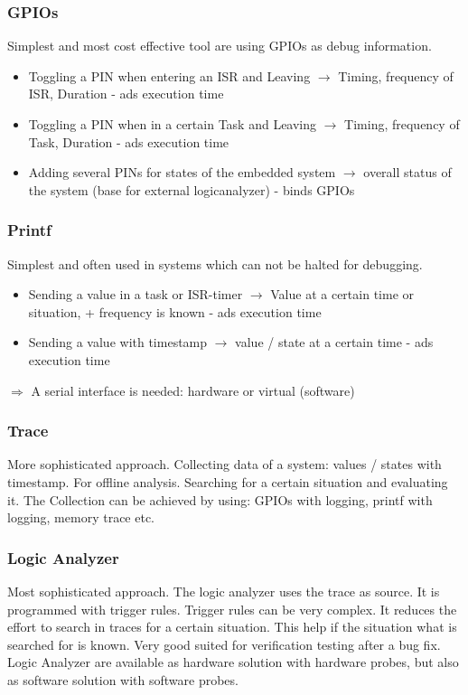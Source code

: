 \subsubsection{GPIOs}
Simplest and most cost effective tool are using GPIOs as debug information.
\begin{itemize}
    \item Toggling a PIN when entering an ISR and Leaving $\rightarrow$ Timing, frequency of ISR, Duration - ads execution time
    \item Toggling a PIN when in a certain Task and Leaving $\rightarrow$ Timing, frequency of Task, Duration - ads execution time
    \item Adding several PINs for states of the embedded system $\rightarrow$ overall status of the system (base for external logicanalyzer) - binds GPIOs
\end{itemize}

\subsubsection{Printf}
Simplest and often used in systems which can not be halted for debugging.
\begin{itemize}
    \item Sending a value in a task or ISR-timer $\rightarrow$ Value at a certain time or situation, + frequency is known - ads execution time
    \item Sending a value with timestamp $\rightarrow$ value / state at a certain time - ads execution time
\end{itemize}
$\Rightarrow$ A serial interface is needed: hardware or virtual (software)

\subsubsection{Trace}
More sophisticated approach.
Collecting data of a system: values / states with timestamp.
For offline analysis.
Searching for a certain situation and evaluating it.
The Collection can be achieved by using: GPIOs with logging, printf with logging, memory trace etc.

\subsubsection{Logic Analyzer}
Most sophisticated approach.
The logic analyzer uses the trace as source.
It is programmed with trigger rules.
Trigger rules can be very complex.
It reduces the effort to search in traces for a certain situation.
This help if the situation what is searched for is known.
Very good suited for verification testing after a bug fix.
Logic Analyzer are available as hardware solution with hardware probes, but also as software solution with software probes.

